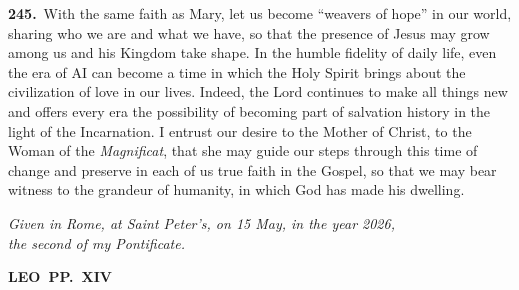 \documentclass{article}
\begin{document}
\textbf{245.}\ With the same faith as Mary, let us become ``weavers of hope'' in our world, sharing who we are and what we have, so that the presence of Jesus may grow among us and his Kingdom take shape. In the humble fidelity of daily life, even the era of AI can become a time in which the Holy Spirit brings about the civilization of love in our lives. Indeed, the Lord continues to make all things new and offers every era the possibility of becoming part of salvation history in the light of the Incarnation. I entrust our desire to the Mother of Christ, to the Woman of the \emph{Magnificat}, that she may guide our steps through this time of change and preserve in each of us true faith in the Gospel, so that we may bear witness to the grandeur of humanity, in which God has made his dwelling.

\vspace{2em}

\begin{flushleft}
\itshape Given in Rome, at Saint Peter's, on 15 May, in the year 2026,\\
the second of my Pontificate.
\end{flushleft}

\vspace{2em}

\begin{center}
{\Large\bfseries LEO~PP.\ XIV}
\end{center}
\end{document}
